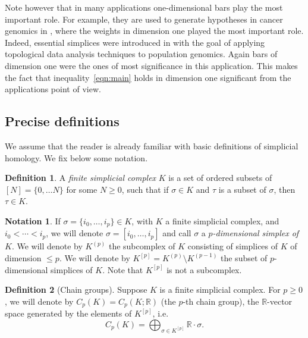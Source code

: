 \documentclass[11pt]{amsart}
\theoremstyle{theorem}
\theoremstyle{remark}
\theoremstyle{definition}
\newtheorem{definition}{Definition}[section]
\newtheorem{notation}{Notation}[section]
\newcommand{\R}{\mathbb{R}}
\newcommand{\sqbracket}[1]{[#1]}
\begin{document}
Note however that in many applications one-dimensional bars play the most important role. 
For example, they are used  to generate hypotheses in cancer genomics in \cite{Gurnari-et-al}, where
the weights in dimension one  played the most important role.
Indeed, essential simplices were introduced in \cite{essential} with the goal of applying topological data analysis techniques
to population genomics. Again bars of dimension one were the ones of most significance in this application. This makes the fact that inequality~\eqref{eqn:main} holds in dimension one
significant from the applications point of view.




\subsection{Precise definitions}
\label{subsec:precise}
We assume that the reader is already familiar with basic definitions of simplicial homology.  We fix below some notation.

\begin{definition}
\label{def:simplicial-complex}
A \emph{finite simplicial complex} $K$ is a set of ordered subsets of $[N] = \{0,\ldots N\}$ for some $N \geq 0$, such that if $\sigma \in K$ and $\tau$
is a subset of $\sigma$, then $\tau \in K$. 
\end{definition}

\begin{notation}
\label{def:p-simplices}
If $\sigma = \{i_0,\ldots,i_p\} \in K$, 
with $K$ a finite simplicial complex,
and $i_0 < \cdots < i_p $, we will denote $\sigma = [i_0,\ldots,i_p]$ and call $\sigma$ a \emph{$p$-dimensional simplex of $K$}. 
We will denote by $K^{(p)}$ the subcomplex of $K$ consisting of simplices of $K$ of dimension $\leq p$.
We will denote by $K^{\sqbracket{p}} = K^{(p)} \setminus K^{(p-1)}$ the subset of $p$-dimensional simplices of $K$.
Note that $K^{\sqbracket{p}}$ is not a subcomplex.
\end{notation}

\begin{definition}[Chain groups]
\label{def:chain-groups}
Suppose $K$ is a finite simplicial complex.
For $p \geq 0$,  we will denote by 
$C_p(K) = C_p(K;\R)$ (the $p$-th chain group),   
the $\R$-vector space generated by the elements of $K^{\sqbracket{p}}$,
i.e.
\[
C_p(K) = \bigoplus_{\sigma \in K^{\sqbracket{p}}}\R \cdot \sigma.
\]
\end{definition}
\end{document}

